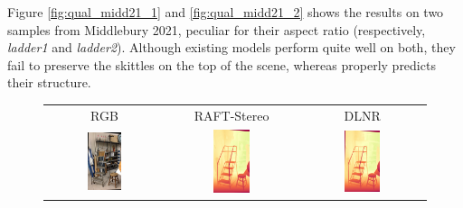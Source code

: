 \clearpage

Figure \ref{fig:qual_midd21_1} and \ref{fig:qual_midd21_2} shows the results on two samples from Middlebury 2021, peculiar for their aspect ratio (respectively, \textit{ladder1} and \textit{ladder2}). Although existing models perform quite well on both, they fail to preserve the skittles on the top of the scene, whereas \method properly predicts their structure.

\begin{figure}[h]
    \centering
    \renewcommand{\tabcolsep}{1pt}
    \begin{tabular}{ccc}
        \small RGB &
        \small RAFT-Stereo \cite{lipson2021raft} &
        \small DLNR \cite{zhao2023high} \\
        \includegraphics[width=0.3\textwidth]{imgs/midd21/rgb/10.jpg} & 
        \includegraphics[width=0.3\textwidth]{imgs/midd21/stereo/RAFT-Stereo/10.jpg} &
        \includegraphics[width=0.3\textwidth]{imgs/midd21/stereo/DLNR/10.jpg} \\

\end{tabular}
\end{figure}
